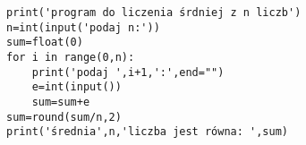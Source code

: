 \begin{verbatim}
print('program do liczenia śrdniej z n liczb')
n=int(input('podaj n:'))
sum=float(0)
for i in range(0,n):
    print('podaj ',i+1,':',end="")
    e=int(input())
    sum=sum+e
sum=round(sum/n,2)
print('średnia',n,'liczba jest równa: ',sum)
\end{verbatim}
